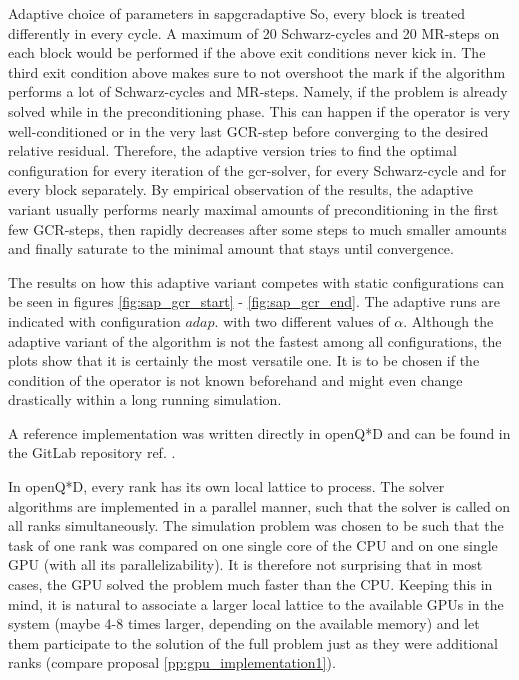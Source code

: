 \documentclass{article}
\theoremstyle{plain} %
\theoremstyle{convention} %
\theoremstyle{remark} %
\numberwithin{equation}{section}
\begin{document}
\begin{proposal}{Adaptive choice of parameters in \acrshort{sapgcr}}{adaptive}
So, every block is treated differently in every cycle. A maximum of \num{20} Schwarz-cycles and \num{20} MR-steps on each block would be performed if the above exit conditions never kick in. The third exit condition above makes sure to not overshoot the mark if the algorithm performs a lot of Schwarz-cycles and MR-steps. Namely, if the problem is already solved while in the preconditioning phase. This can happen if the operator is very well-conditioned or in the very last GCR-step before converging to the desired relative residual. Therefore, the adaptive version tries to find the optimal configuration for every iteration of the \acrshort{gcr}-solver, for every Schwarz-cycle and for every block separately. By empirical observation of the results, the adaptive variant usually performs nearly maximal amounts of preconditioning in the first few GCR-steps, then rapidly decreases after some steps to much smaller amounts and finally saturate to the minimal amount that stays until convergence.

The results on how this adaptive variant competes with static configurations can be seen in figures \ref{fig:sap_gcr_start} - \ref{fig:sap_gcr_end}. The adaptive runs are indicated with configuration $adap.$ with two different values of $\alpha$. Although the adaptive variant of the algorithm is not the fastest among all configurations, the plots show that it is certainly the most versatile one. It is to be chosen if the condition of the operator is not known beforehand and might even change drastically within a long running simulation.

A reference implementation was written directly in openQ*D and can be found in the GitLab repository ref. \cite{gitlab_adaptive}.

\end{proposal}

In openQ*D, every rank has its own local lattice to process. The solver algorithms are implemented in a parallel manner, such that the solver is called on all ranks simultaneously. The simulation problem was chosen to be such that the task of one rank was compared on one single core of the CPU and on one single GPU (with all its parallelizability). It is therefore not surprising that in most cases, the GPU solved the problem much faster than the CPU. Keeping this in mind, it is natural to associate a larger local lattice to the available GPUs in the system (maybe 4-8 times larger, depending on the available memory) and let them participate to the solution of the full problem just as they were additional ranks (compare proposal \ref{pp:gpu_implementation1}).
\end{document}
